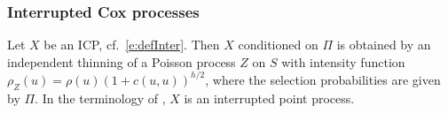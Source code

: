 \documentclass[alpha-refs]{wiley-article}
\begin{document}
%
%


\subsubsection{Interrupted Cox processes}

Let $X$ be an ICP, cf.\ \eqref{e:defInter}.
Then $X$ conditioned on $\Pi$ is obtained by an independent thinning of a Poisson process $Z$ on $S$ with intensity function $\rho_Z(u)=\rho(u)\left(1+c(u,u)\right)^{h/2}$, where the selection probabilities are given by $\Pi$. In the terminology of \citet{Stoyan}, $X$ is an interrupted point process. 
\end{document}
